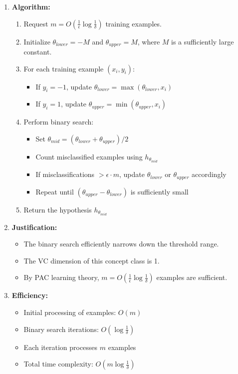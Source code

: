 \documentclass{article}
\begin{document}
\begin{enumerate}
    \item \textbf{Algorithm:}
    \begin{enumerate}
        \item Request $m = O(\frac{1}{\epsilon} \log \frac{1}{\delta})$ training examples.
        \item Initialize $\theta_{lower} = -M$ and $\theta_{upper} = M$, where $M$ is a sufficiently large constant.
        \item For each training example $(x_i, y_i)$:
            \begin{itemize}
                \item If $y_i = -1$, update $\theta_{lower} = \max(\theta_{lower}, x_i)$
                \item If $y_i = 1$, update $\theta_{upper} = \min(\theta_{upper}, x_i)$
            \end{itemize}
        \item Perform binary search:
            \begin{itemize}
                \item Set $\theta_{mid} = (\theta_{lower} + \theta_{upper}) / 2$
                \item Count misclassified examples using $h_{\theta_{mid}}$
                \item If misclassifications $> \epsilon \cdot m$, update $\theta_{lower}$ or $\theta_{upper}$ accordingly
                \item Repeat until $(\theta_{upper} - \theta_{lower})$ is sufficiently small
            \end{itemize}
        \item Return the hypothesis $h_{\theta_{mid}}$
    \end{enumerate}

    \item \textbf{Justification:}
    \begin{itemize}
        \item The binary search efficiently narrows down the threshold range.
        \item The VC dimension of this concept class is 1.
        \item By PAC learning theory, $m = O(\frac{1}{\epsilon} \log \frac{1}{\delta})$ examples are sufficient.
    \end{itemize}

    \item \textbf{Efficiency:}
    \begin{itemize}
        \item Initial processing of examples: $O(m)$
        \item Binary search iterations: $O(\log \frac{1}{\delta})$
        \item Each iteration processes $m$ examples
        \item Total time complexity: $O(m \log \frac{1}{\delta})$
    \end{itemize}


\end{enumerate}
\end{document}
